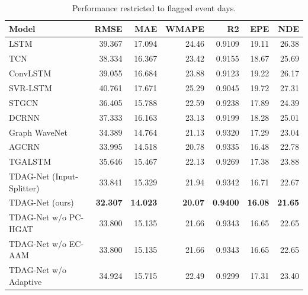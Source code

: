 \begin{table}[!t]
\caption{Performance restricted to flagged event days.}
\label{tab:event_results}
\centering
\footnotesize
\begin{tabular}{lrrrrrr}
\toprule
Model & RMSE & MAE & WMAPE & R2 & EPE & NDE \\
\midrule
LSTM & 39.367 & 17.094 & 24.46 & 0.9109 & 19.11 & 26.38 \\
TCN & 38.334 & 16.367 & 23.42 & 0.9155 & 18.67 & 25.69 \\
ConvLSTM & 39.055 & 16.684 & 23.88 & 0.9123 & 19.22 & 26.17 \\
SVR-LSTM & 40.761 & 17.671 & 25.29 & 0.9045 & 19.72 & 27.31 \\
STGCN & 36.405 & 15.788 & 22.59 & 0.9238 & 17.89 & 24.39 \\
DCRNN & 37.333 & 16.163 & 23.13 & 0.9199 & 18.28 & 25.01 \\
Graph WaveNet & 34.389 & 14.764 & 21.13 & 0.9320 & 17.29 & 23.04 \\
AGCRN & 33.995 & 14.518 & 20.78 & 0.9335 & 16.48 & 22.78 \\
TGALSTM & 35.646 & 15.467 & 22.13 & 0.9269 & 17.38 & 23.88 \\
TDAG-Net (Input-Splitter) & 33.841 & 15.329 & 21.94 & 0.9342 & 16.71 & 22.67 \\
TDAG-Net (ours) & \textbf{32.307} & \textbf{14.023} & \textbf{20.07} & \textbf{0.9400} & \textbf{16.08} & \textbf{21.65} \\
TDAG-Net w/o PC-HGAT & 33.800 & 15.135 & 21.66 & 0.9343 & 16.65 & 22.65 \\
TDAG-Net w/o EC-AAM & 33.800 & 15.135 & 21.66 & 0.9343 & 16.65 & 22.65 \\
TDAG-Net w/o Adaptive & 34.924 & 15.715 & 22.49 & 0.9299 & 17.31 & 23.40 \\
\bottomrule
\end{tabular}
\end{table}
